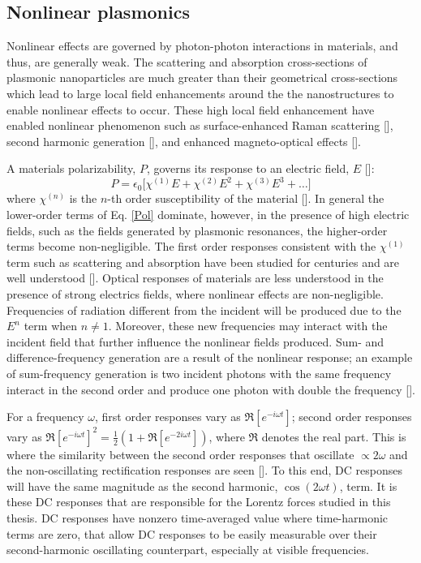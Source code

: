 \subsection{Nonlinear plasmonics}
\par Nonlinear effects are governed by photon-photon interactions in materials, and thus, are generally weak. The scattering and absorption cross-sections of plasmonic nanoparticles are much greater than their geometrical cross-sections which lead to large local field enhancements around the the nanostructures to enable nonlinear effects to occur. These high local field enhancement have enabled nonlinear phenomenon such as surface-enhanced Raman scattering [\cite{Nie}], second harmonic generation [\cite{Canfield}], and enhanced magneto-optical effects [\cite{Moocarme2014,Belotelov}]. 

A materials polarizability, $P$, governs its response to an electric field, $E$ [\cite{Kauranen}]:
\begin{equation}
P = \epsilon_0\big[\chi^{(1)}E+\chi^{(2)}E^2+\chi^{(3)}E^3+\ldots\big]
\label{Pol}
\end{equation}
where $\chi^{(n)}$ is the $n$-th order susceptibility of the material [\cite{Boyd}]. In general the lower-order terms of Eq. \ref{Pol} dominate, however, in the presence of high electric fields, such as the fields generated by plasmonic resonances, the higher-order terms become non-negligible. The first order responses consistent with the $\chi^{(1)}$ term such as scattering and absorption have been studied for centuries and are well understood [\cite{Mie, Hulst}]. Optical responses of materials are less understood in the presence of strong electrics fields,  where nonlinear effects are non-negligible. Frequencies of radiation different from the incident will be produced due to the $E^n$ term when $n\neq 1$. Moreover, these new frequencies may interact with the incident field that further influence the nonlinear fields produced. Sum- and difference-frequency generation are a result of the nonlinear response; an example of sum-frequency generation is two incident photons with the same frequency interact in the second order and produce one photon with double the frequency [\cite{Canfield}].

For a frequency $\omega$, first order responses vary as $\Re[e^{-i\omega t}]$; second order responses vary as $\Re[e^{-i\omega t}]^2 = \frac{1}{2}(1+\Re[e^{-2i\omega t}])$, where $\Re$ denotes the real part. This is where the similarity between the second order responses that oscillate $\propto 2\omega$ and the non-oscillating rectification responses are seen [\cite{Shen}]. To this end, DC responses will have the same magnitude  as the second harmonic, $\cos(2\omega t)$, term. It is these DC responses that are responsible for the Lorentz forces studied in this thesis. DC responses have nonzero time-averaged value where time-harmonic terms are zero, that allow DC responses to be easily measurable over their second-harmonic oscillating counterpart, especially at visible frequencies.

